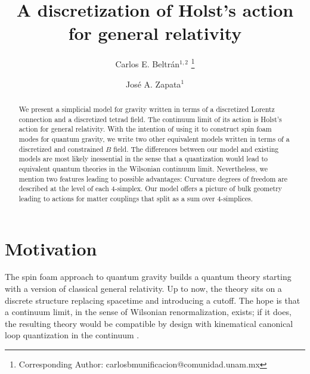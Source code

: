\documentclass{article}
\begin{document}
\title{
A discretization of Holst's action for general relativity
}
\author{
Carlos E. Beltrán$^{1,2}$
\footnote{Corresponding Author: \ttfamily carlosbmunificacion@comunidad.unam.mx}
}
\author{
José A. Zapata$^1$
}
%
%



\date{}
\maketitle

\begin{abstract} 
We present a simplicial model for gravity written in terms of a discretized Lorentz connection and a discretized tetrad field. The continuum limit of its action is Holst's action for general relativity. With the intention of using it to construct spin foam modes for quantum gravity, we write two other equivalent models written in terms of a discretized and constrained $B$ field. 
The differences between our model and existing models are most likely inessential in the sense that a quantization would lead to equivalent quantum theories in the Wilsonian continuum limit. 
Nevertheless, we mention two features leading to possible advantages: 
Curvature degrees of freedom are described at the level of each 4-simplex. 
Our model offers a picture of bulk geometry leading to actions for matter couplings that split as a sum over 4-simplices. 
%
\end{abstract}

\tableofcontents


\section{Motivation}%
\label{Motivation}


The spin foam approach to quantum gravity \cite{Perez1, RV} builds a quantum theory starting with a version of classical general relativity. Up to now, the theory sits on a discrete structure replacing spacetime and introducing a cutoff. The hope is that a continuum limit, in the sense of Wilsonian renormalization, exists; if it does, the resulting theory would be compatible by design with kinematical canonical loop quantization in the continuum \cite{LQ}. 
\end{document}
